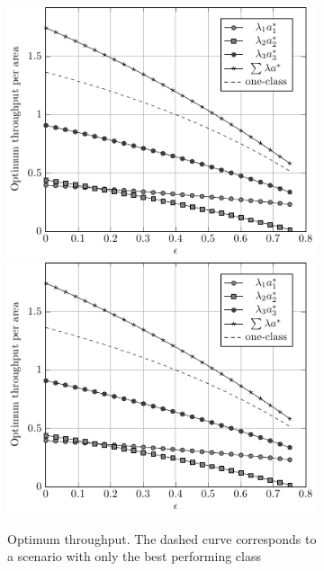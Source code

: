 \begin{figure}
\begin{subfigure}{.05\textwidth}
\end{subfigure}%
\begin{subfigure}[t]{.45\textwidth}%
  \centering
    \if{}
        \includegraphics[width=\textwidth]{Figures/Ch7_Opt_lam_a_eps.pdf}
    \else
        \includegraphics[draft,width=\textwidth]{Figures/Ch7_Opt_lam_a_eps.pdf}
    \fi
    \caption{Optimum throughput. The dashed curve corresponds to a scenario with only the best performing class}
    \label{fig:Opt_lam_a_eps}
\end{subfigure}
%
\begin{subfigure}[t]{.45\textwidth}%

\end{subfigure}
\end{figure}
